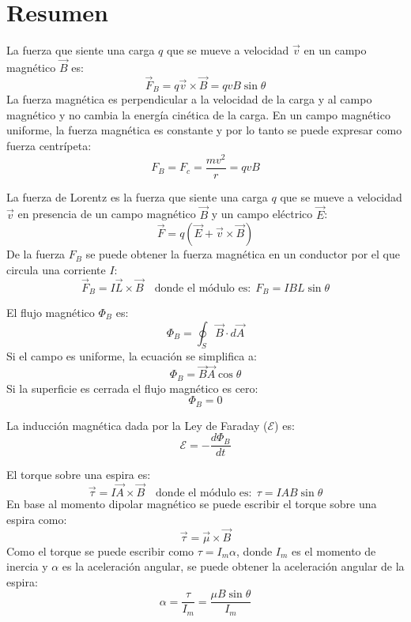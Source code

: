 \section{Resumen}

\begin{tcolorbox}[title=Campo magnético]
  La fuerza que siente una carga \(q\) que se mueve a velocidad \(\vec{v}\) en un campo magnético \(\vec{B}\) es:
  \[
    \vec{F}_B = q \vec{v} \times \vec{B} = qvB\sin\theta
  \]
  La fuerza magnética es perpendicular a la velocidad de la carga y al campo magnético y no cambia la energía cinética de la carga. En un campo magnético uniforme, la fuerza magnética es constante y por lo tanto se puede expresar como fuerza centrípeta:
  \[
    F_B = F_c = \frac{mv^2}{r} = qvB
  \]
\end{tcolorbox}

\begin{tcolorbox}[title=Fuerza de Lorentz]
  La fuerza de Lorentz es la fuerza que siente una carga \(q\) que se mueve a velocidad \(\vec{v}\) en presencia de un campo magnético \(\vec{B}\) y un campo eléctrico \(\vec{E}\):
  \[
    \vec{F} = q\left(\vec{E} + \vec{v} \times \vec{B}\right)
  \]
  De la fuerza \(F_B\) se puede obtener la fuerza magnética en un conductor por el que circula una corriente \(I\):
  \[
    \vec{F}_B = I\vec{L} \times \vec{B} \quad \text{donde el módulo es:} ~~ F_B = IBL\sin\theta
  \]
\end{tcolorbox}

\begin{tcolorbox}[title=Flujo Magnético]
  El flujo magnético \(\Phi_B\) es:
  \[
    \Phi_B = \oint_S \vec{B} \cdot d\vec{A}
  \]
  Si el campo es uniforme, la ecuación se simplifica a:
  \[
    \Phi_B = \vec{B}\vec{A}\cos\theta
  \]
  Si la superficie es cerrada el flujo magnético es cero:
  \[
    \Phi_B = 0
  \]
\end{tcolorbox}

\begin{tcolorbox}[title=Inducción magnética]
  La inducción magnética dada por la Ley de Faraday (\(\mathcal{E}\)) es:
  \[
    \mathcal{E} = -\frac{d\Phi_B}{dt}
  \]
\end{tcolorbox}

\begin{tcolorbox}[title=Torque sobre una espira]
  El torque sobre una espira es:
  \[
    \vec{\tau} = I\vec{A} \times \vec{B} \quad \text{donde el módulo es:} ~~ \tau = IAB\sin\theta
  \]
  En base al momento dipolar magnético se puede escribir el torque sobre una espira como:
  \[
    \vec{\tau} = \vec{\mu} \times \vec{B}
  \]
  Como el torque se puede escribir como \(\tau = I_m\alpha\), donde \(I_m\) es el momento de inercia y \(\alpha\) es la aceleración angular, se puede obtener la aceleración angular de la espira:
  \[
    \alpha = \frac{\tau}{I_m} = \frac{\mu B \sin\theta}{I_m}
  \]
\end{tcolorbox}

